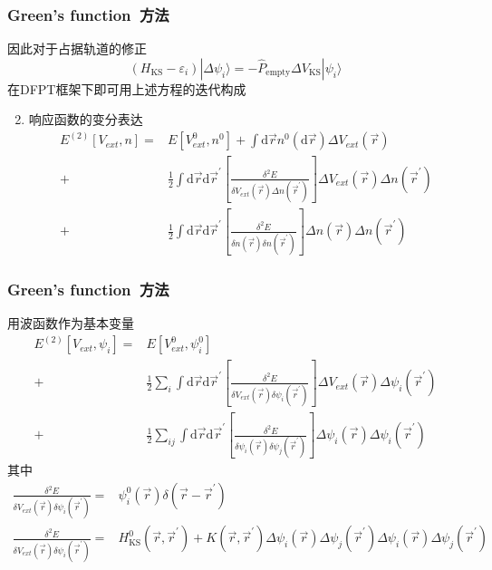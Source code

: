 \documentclass[cjk,slidestop,compress,mathserif,blue]{beamer}
\begin{document}
\frame
{
	\frametitle{\textrm{Green's function~}方法}
因此对于占据轨道的修正
					\begin{displaymath}
						(H_{\mathrm{KS}}-\varepsilon_i)|\Delta\psi_i\rangle=-\hat P_{\mathrm{empty}}\Delta V_{\mathrm{KS}}|\psi_i\rangle
					\end{displaymath}
					在\textrm{DFPT}框架下即可用上述方程的迭代构成

					\begin{enumerate}
						\setcounter{enumi}{1}
						\item 响应函数的变分表达
							\begin{displaymath}
								\begin{aligned}
									E^{(2)}[V_{ext},n]=&E[V_{ext}^0,n^0]+\int\mathrm{d}\vec rn^0(\mathrm{d}\vec r)\Delta V_{ext}(\vec r)\\
									+&\frac12\int\mathrm{d}\vec r\mathrm{d}\vec r^{\prime}\left[ \frac{\delta^2E}{\delta V_{ext}(\vec r)\Delta n(\vec r^{\prime})} \right]\Delta V_{ext}(\vec r)\Delta n(\vec r^{\prime})\\
									+&\frac12\int\mathrm{d}\vec r\mathrm{d}\vec r^{\prime}\left[ \frac{\delta^2E}{\delta n(\vec r)\delta n(\vec r^{\prime})} \right]\Delta n(\vec r)\Delta n(\vec r^{\prime})
								\end{aligned}
							\end{displaymath}
					\end{enumerate}
}

\frame
{
	\frametitle{\textrm{Green's function~}方法}
	用波函数作为基本变量
							\begin{displaymath}
								\begin{aligned}
									E^{(2)}[V_{ext},\psi_i]=&E[V_{ext}^0,\psi_i^0]\\
									+&\frac12\sum_i\int\mathrm{d}\vec r\mathrm{d}\vec r^{\prime}\left[ \frac{\delta^2E}{\delta V_{ext}(\vec r)\delta\psi_i(\vec r^{\prime})} \right]\Delta V_{ext}(\vec r)\Delta\psi_i(\vec r^{\prime})\\
									+&\frac12\sum_{ij}\int\mathrm{d}\vec r\mathrm{d}\vec r^{\prime}\left[ \frac{\delta^2E}{\delta\psi_i(\vec r)\delta\psi_j(\vec r^{\prime})} \right]\Delta\psi_i(\vec r)\Delta\psi_i(\vec r^{\prime})
								\end{aligned}
							\end{displaymath}
							其中
							\begin{displaymath}
								\begin{aligned}
									\frac{\delta^2E}{\delta V_{ext}(\vec r)\delta\psi_i(\vec r^{\prime})}=&\psi_i^0(\vec r)\delta(\vec r-\vec r^{\prime})\\
									\frac{\delta^2E}{\delta V_{ext}(\vec r)\delta\psi_i(\vec r^{\prime})}=&H_{\mathrm{KS}}^0(\vec r,\vec r^{\prime})+K(\vec r,\vec r^{\prime})\Delta\psi_i(\vec r)\Delta\psi_j(\vec r^{\prime})\Delta\psi_i(\vec r)\Delta\psi_j(\vec r^{\prime})
								\end{aligned}
							\end{displaymath}

}
\end{document}
